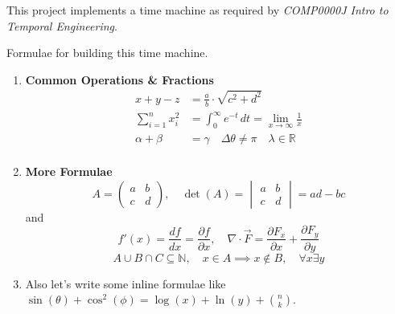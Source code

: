 
\renewcommand{\abstractname}{Abstract}


%
%
\begin{monochromeabstract}
    This project implements a time machine as required by \textit{COMP0000J Intro to Temporal Engineering}.
\end{monochromeabstract}


\question{}
Formulae for building this time machine.
\begin{enumerate}[label=(\alph*)]
    \item \textbf{Common Operations \& Fractions}
        \begin{align}
            x + y - z &= \frac{a}{b} \cdot \sqrt{c^2 + d^2} \\
            \sum_{i=1}^{n} x_i^2 &= \int_{0}^{\infty} e^{-t} \, dt = \lim_{x \to \infty} \frac{1}{x} \\
            \alpha + \beta &= \gamma \quad \Delta \theta \neq \pi \quad \lambda \in \mathbb{R} \\
        \end{align}
    \item \textbf{More Formulae}
        $$
            A = \begin{pmatrix} a & b \\ c & d \end{pmatrix}, \quad
            \det(A) = \begin{vmatrix} a & b \\ c & d \end{vmatrix} = ad - bc
        $$
        and
        $$
            f'(x) = \frac{df}{dx} = \frac{\partial f}{\partial x}, \quad
            \nabla \cdot \vec{F} = \frac{\partial F_x}{\partial x} + \frac{\partial F_y}{\partial y}
        $$
        $$
            A \cup B \cap C \subseteq \mathbb{N}, \quad x \in A \implies x \notin B, \quad \forall x \exists y
        $$
    \item Also let's write some inline formulae like $\sin(\theta) + \cos^2(\phi) = \log(x) + \ln(y) + \binom{n}{k}$.
\end{enumerate}

